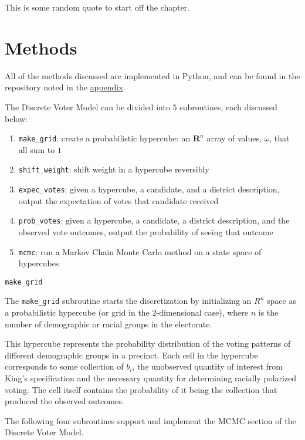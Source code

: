 \begin{savequote}[75mm]
This is some random quote to start off the chapter.
\end{savequote}

\chapter{Methods}

All of the methods discussed are implemented in Python, and can be found in the repository noted in the \hyperref[sec:appendix]{appendix}.

The Discrete Voter Model can be divided into $5$ subroutines, each discussed below:

\begin{enumerate}
  \item \texttt{make\_grid}: create a probabilistic hypercube: an $\mathbf{R}^n$ array of values, $\omega$, that all sum to $1$
  \item \texttt{shift\_weight}: shift weight in a hypercube reversibly
  \item \texttt{expec\_votes}: given a hypercube, a candidate, and a district description, output the expectation of votes that candidate received
  \item \texttt{prob\_votes}: given a hypercube, a candidate, a district description, and the observed vote outcomes, output the probability of seeing that outcome
  \item \texttt{mcmc}: run a Markov Chain Monte Carlo method on a state space of hypercubes
\end{enumerate}


\texttt{make\_grid}


The \texttt{make\_grid} subroutine starts the discretization by initializing an $R^n$ space as a probabilistic hypercube (or grid in the $2$-dimensional case), where $n$ is the number of demographic or racial groups in the electorate.

This hypercube represents the probability distribution of the voting patterns of different demographic groups in a precinct. Each cell in the hypercube corresponds to some collection of $b_i$, the unobserved quantity of interest from King's specification and the necessary quantity for determining racially polarized voting. The cell itself contains the probability of it being the collection that produced the observed outcomes.

The following four subroutines support and implement the MCMC section of the Discrete Voter Model.


